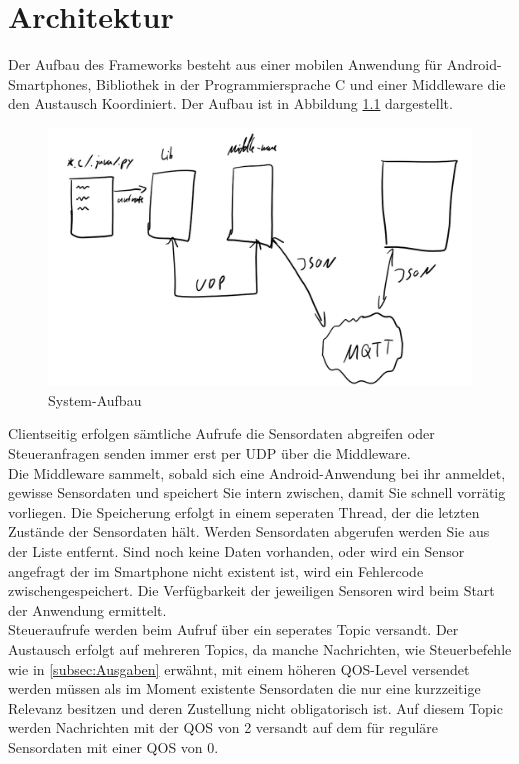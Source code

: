 \documentclass[11pt,a4paper]{report}
\begin{document}
\chapter{Architektur} \label{chap:architektur}
Der Aufbau des Frameworks besteht aus einer mobilen Anwendung für Android-Smartphones, Bibliothek in der Programmiersprache C und einer Middleware die den Austausch Koordiniert.
Der Aufbau ist in Abbildung \ref{fig:design} dargestellt.
\begin{figure}[htbp]
  \centering
  \includegraphics[width=.9\textwidth]{images/design.png}
  \caption{System-Aufbau}
  \label{fig:design}
\end{figure}
Clientseitig erfolgen sämtliche Aufrufe die Sensordaten abgreifen oder Steueranfragen senden immer erst per UDP über die Middleware.
\\
Die Middleware sammelt, sobald sich eine Android-Anwendung bei ihr anmeldet, gewisse Sensordaten und speichert Sie intern zwischen, damit Sie schnell vorrätig vorliegen.
Die Speicherung erfolgt in einem seperaten Thread, der die letzten Zustände der Sensordaten hält.
Werden Sensordaten abgerufen werden Sie aus der Liste entfernt.
Sind noch keine Daten vorhanden, oder wird ein Sensor angefragt der im Smartphone nicht existent ist, wird ein Fehlercode zwischengespeichert.
Die Verfügbarkeit der jeweiligen Sensoren wird beim Start der Anwendung ermittelt.
\\
Steueraufrufe werden beim Aufruf über ein seperates Topic versandt.
Der Austausch erfolgt auf mehreren Topics, da manche Nachrichten, wie Steuerbefehle wie in \ref{subsec:Ausgaben} erwähnt, mit einem höheren QOS-Level versendet werden müssen als im Moment existente Sensordaten die nur eine kurzzeitige Relevanz besitzen und deren Zustellung nicht obligatorisch ist.
Auf diesem Topic werden Nachrichten mit der QOS von 2 versandt auf dem für reguläre Sensordaten mit einer QOS von 0.
\end{document}
